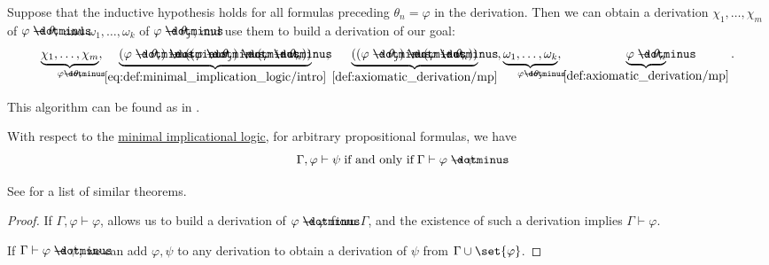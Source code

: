 \begin{algorithm}
\begin{thmenum}
    Suppose that the inductive hypothesis holds for all formulas preceding \( \theta_n = \varphi \) in the derivation. Then we can obtain a derivation \( \chi_1, \ldots, \chi_m \) of \( \varphi \synimplies \theta_i \) and \( \omega_1, \ldots, \omega_k \) of \( \varphi \synimplies \theta_j \), and use them to build a derivation of our goal:
    \small
    \begin{equation*}
      \underbrace{\chi_1, \ldots, \chi_m}_{\varphi \synimplies \theta_i},
      \underbrace{(\varphi \synimplies \theta_i) \synimplies ((\varphi \synimplies \theta_j) \synimplies (\varphi \synimplies \theta_n))}_{\eqref{eq:def:minimal_implication_logic/intro}},
      \underbrace{((\varphi \synimplies \theta_j) \synimplies (\varphi \synimplies \theta_n))}_{\ref{def:axiomatic_derivation/mp}},
      \underbrace{\omega_1, \ldots, \omega_k}_{\varphi \synimplies \theta_j},
      \underbrace{\varphi \synimplies \theta_n}_{\ref{def:axiomatic_derivation/mp}}.
    \end{equation*}
    \normalsize
  \end{thmenum}
\end{algorithm}
\begin{comments}
  \item This algorithm can be found as  in \cite{notebook:code}.
\end{comments}

\begin{theorem}\label{thm:implicational_syntactic_deduction_theorem}
  With respect to the \hyperref[def:minimal_implication_logic]{minimal implicational logic}, for arbitrary propositional formulas, we have
  \begin{equation*}
    \Gamma, \varphi \vdash \psi \T{if and only if} \Gamma \vdash \varphi \synimplies \psi.
  \end{equation*}
\end{theorem}
\begin{comments}
  \item See  for a list of similar theorems.
\end{comments}
\begin{proof}
  \SufficiencySubProof If \( \Gamma, \varphi \vdash \varphi \),  allows us to build a derivation of \( \varphi \synimplies \varphi \) from \( \Gamma \), and the existence of such a derivation implies \( \Gamma \vdash \varphi \).

  \NecessitySubProof If \( \Gamma \vdash \varphi \synimplies \psi \), we can add \( \varphi, \psi \) to any derivation to obtain a derivation of \( \psi \) from \( \Gamma \cup \set{ \varphi } \).
\end{proof}

